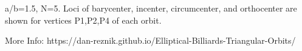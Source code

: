 a/b=1.5, N=5. Loci of barycenter, incenter, circumcenter, and orthocenter are shown for vertices P1,P2,P4 of each orbit.

More Info: https://dan-reznik.github.io/Elliptical-Billiards-Triangular-Orbits/